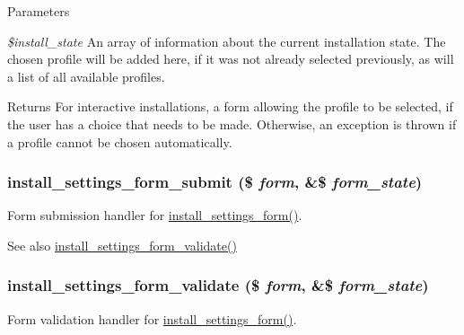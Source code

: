 \begin{DoxyParams}{Parameters}
\item[{\em \$install\_\-state}]An array of information about the current installation state. The chosen profile will be added here, if it was not already selected previously, as will a list of all available profiles.\end{DoxyParams}
\begin{DoxyReturn}{Returns}
For interactive installations, a form allowing the profile to be selected, if the user has a choice that needs to be made. Otherwise, an exception is thrown if a profile cannot be chosen automatically. 
\end{DoxyReturn}
\hypertarget{install_8core_8inc_abe061599cf0c6252388fc93366ebae27}{
\subsubsection[{install\_\-settings\_\-form\_\-submit}]{\setlength{\rightskip}{0pt plus 5cm}install\_\-settings\_\-form\_\-submit (\$ {\em form}, \/  \&\$ {\em form\_\-state})}}
\label{install_8core_8inc_abe061599cf0c6252388fc93366ebae27}
Form submission handler for \hyperlink{group__forms_ga4fe8554aa15e5b0b78a15400c2d37d28}{install\_\-settings\_\-form()}.

\begin{DoxySeeAlso}{See also}
\hyperlink{install_8core_8inc_a81a30e13b22aa1ad8b0fa4b8f2f07c82}{install\_\-settings\_\-form\_\-validate()} 
\end{DoxySeeAlso}
\hypertarget{install_8core_8inc_a81a30e13b22aa1ad8b0fa4b8f2f07c82}{
\subsubsection[{install\_\-settings\_\-form\_\-validate}]{\setlength{\rightskip}{0pt plus 5cm}install\_\-settings\_\-form\_\-validate (\$ {\em form}, \/  \&\$ {\em form\_\-state})}}
\label{install_8core_8inc_a81a30e13b22aa1ad8b0fa4b8f2f07c82}
Form validation handler for \hyperlink{group__forms_ga4fe8554aa15e5b0b78a15400c2d37d28}{install\_\-settings\_\-form()}.

